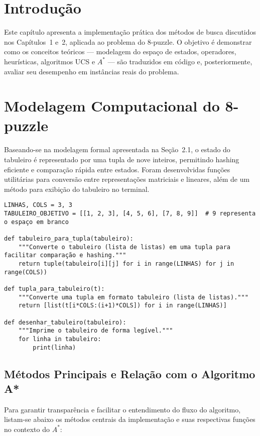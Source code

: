 
\section{Introdução}  
Este capítulo apresenta a implementação prática dos métodos de busca discutidos nos Capítulos~1 e~2, aplicada ao problema do 8-puzzle. O objetivo é demonstrar como os conceitos teóricos — modelagem do espaço de estados, operadores, heurísticas, algoritmos UCS e $A^*$ — são traduzidos em código e, posteriormente, avaliar seu desempenho em instâncias reais do problema.  

\section{Modelagem Computacional do 8-puzzle}  
Baseando-se na modelagem formal apresentada na Seção~2.1, o estado do tabuleiro é representado por uma tupla de nove inteiros, permitindo hashing eficiente e comparação rápida entre estados. Foram desenvolvidas funções utilitárias para conversão entre representações matriciais e lineares, além de um método para exibição do tabuleiro no terminal.  

\begin{verbatim}  
LINHAS, COLS = 3, 3  
TABULEIRO_OBJETIVO = [[1, 2, 3], [4, 5, 6], [7, 8, 9]]  # 9 representa o espaço em branco  

def tabuleiro_para_tupla(tabuleiro):  
    """Converte o tabuleiro (lista de listas) em uma tupla para facilitar comparação e hashing."""  
    return tuple(tabuleiro[i][j] for i in range(LINHAS) for j in range(COLS))  

def tupla_para_tabuleiro(t):  
    """Converte uma tupla em formato tabuleiro (lista de listas)."""  
    return [list(t[i*COLS:(i+1)*COLS]) for i in range(LINHAS)]  

def desenhar_tabuleiro(tabuleiro):  
    """Imprime o tabuleiro de forma legível."""  
    for linha in tabuleiro:  
        print(linha)  
\end{verbatim}  

\subsection{Métodos Principais e Relação com o Algoritmo A*}  
Para garantir transparência e facilitar o entendimento do fluxo do algoritmo, listam-se abaixo os métodos centrais da implementação e suas respectivas funções no contexto do $A^*$:  

